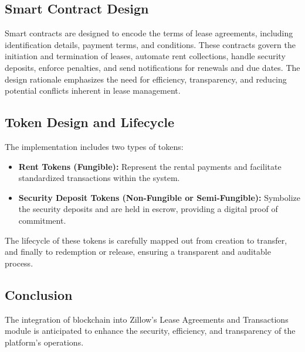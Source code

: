 \documentclass{article}
\begin{document}
\subsection{Smart Contract Design}
Smart contracts are designed to encode the terms of lease agreements, including identification details, payment terms, and conditions. These contracts govern the initiation and termination of leases, automate rent collections, handle security deposits, enforce penalties, and send notifications for renewals and due dates. The design rationale emphasizes the need for efficiency, transparency, and reducing potential conflicts inherent in lease management.

\subsection{Token Design and Lifecycle}
The implementation includes two types of tokens:
\begin{itemize}
    \item \textbf{Rent Tokens (Fungible):} Represent the rental payments and facilitate standardized transactions within the system.
    \item \textbf{Security Deposit Tokens (Non-Fungible or Semi-Fungible):} Symbolize the security deposits and are held in escrow, providing a digital proof of commitment.
\end{itemize}

The lifecycle of these tokens is carefully mapped out from creation to transfer, and finally to redemption or release, ensuring a transparent and auditable process.

\subsection{Conclusion}
The integration of blockchain into Zillow's Lease Agreements and Transactions module is anticipated to enhance the security, efficiency, and transparency of the platform's operations.
\end{document}
